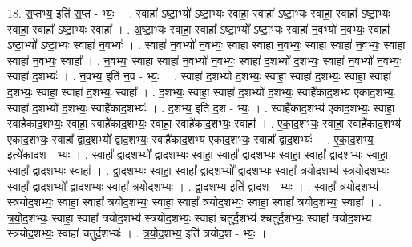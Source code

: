 \documentclass[17pt]{extarticle}
\begin{document}
18. स॒प्तभ्य॒ इति॑ स॒प्त - भ्यः॒ । . स्वाहा᳚ ऽष्टा॒भ्यो᳚ ऽष्टा॒भ्यः स्वाहा॒ स्वाहा᳚ ऽष्टा॒भ्यः स्वाहा॒ स्वाहा᳚ ऽष्टा॒भ्यः स्वाहा॒ स्वाहा᳚ ऽष्टा॒भ्यः स्वाहा᳚ । . अ॒ष्टा॒भ्यः स्वाहा॒ स्वाहा᳚ ऽष्टा॒भ्यो᳚ ऽष्टा॒भ्यः स्वाहा॑ न॒वभ्यो॑ न॒वभ्यः॒ स्वाहा᳚ ऽष्टा॒भ्यो᳚ ऽष्टा॒भ्यः स्वाहा॑ न॒वभ्यः॑ । . स्वाहा॑ न॒वभ्यो॑ न॒वभ्यः॒ स्वाहा॒ स्वाहा॑ न॒वभ्यः॒ स्वाहा॒ स्वाहा॑ न॒वभ्यः॒ स्वाहा॒ स्वाहा॑ न॒वभ्यः॒ स्वाहा᳚ । . न॒वभ्यः॒ स्वाहा॒ स्वाहा॑ न॒वभ्यो॑ न॒वभ्यः॒ स्वाहा॑ द॒शभ्यो॑ द॒शभ्यः॒ स्वाहा॑ न॒वभ्यो॑ न॒वभ्यः॒ स्वाहा॑ द॒शभ्यः॑ । . न॒वभ्य॒ इति॑ न॒व - भ्यः॒ । . स्वाहा॑ द॒शभ्यो॑ द॒शभ्यः॒ स्वाहा॒ स्वाहा॑ द॒शभ्यः॒ स्वाहा॒ स्वाहा॑ द॒शभ्यः॒ स्वाहा॒ स्वाहा॑ द॒शभ्यः॒ स्वाहा᳚ । . द॒शभ्यः॒ स्वाहा॒ स्वाहा॑ द॒शभ्यो॑ द॒शभ्यः॒ स्वाहै॑काद॒शभ्य॑ एकाद॒शभ्यः॒ स्वाहा॑ द॒शभ्यो॑ द॒शभ्यः॒ स्वाहै॑काद॒शभ्यः॑ । . द॒शभ्य॒ इति॑ द॒श - भ्यः॒ । . स्वाहै॑काद॒शभ्य॑ एकाद॒शभ्यः॒ स्वाहा॒ स्वाहै॑काद॒शभ्यः॒ स्वाहा॒ स्वाहै॑काद॒शभ्यः॒ स्वाहा॒ 
स्वाहै॑काद॒शभ्यः॒ स्वाहा᳚ । . ए॒का॒द॒शभ्यः॒ स्वाहा॒ स्वाहै॑काद॒शभ्य॑ एकाद॒शभ्यः॒ स्वाहा᳚ द्वाद॒शभ्यो᳚ द्वाद॒शभ्यः॒ 
स्वाहै॑काद॒शभ्य॑ एकाद॒शभ्यः॒ स्वाहा᳚ द्वाद॒शभ्यः॑ । . ए॒का॒द॒शभ्य॒ इत्ये॑काद॒श - भ्यः॒ । . स्वाहा᳚ द्वाद॒शभ्यो᳚ द्वाद॒शभ्यः॒ स्वाहा॒ स्वाहा᳚ द्वाद॒शभ्यः॒ स्वाहा॒ स्वाहा᳚ द्वाद॒शभ्यः॒ स्वाहा॒ स्वाहा᳚ द्वाद॒शभ्यः॒ स्वाहा᳚ । . द्वा॒द॒शभ्यः॒ स्वाहा॒ स्वाहा᳚ द्वाद॒शभ्यो᳚ द्वाद॒शभ्यः॒ स्वाहा᳚ त्रयोद॒शभ्य॑ स्त्रयोद॒शभ्यः॒ स्वाहा᳚ द्वाद॒शभ्यो᳚ द्वाद॒शभ्यः॒ स्वाहा᳚ त्रयोद॒शभ्यः॑ । . द्वा॒द॒शभ्य॒ इति॑ द्वाद॒श - भ्यः॒ । . स्वाहा᳚ त्रयोद॒शभ्य॑ स्त्रयोद॒शभ्यः॒ स्वाहा॒ स्वाहा᳚ त्रयोद॒शभ्यः॒ स्वाहा॒ स्वाहा᳚ त्रयोद॒शभ्यः॒ स्वाहा॒ स्वाहा᳚ त्रयोद॒शभ्यः॒ स्वाहा᳚ । . त्र॒यो॒द॒शभ्यः॒ स्वाहा॒ स्वाहा᳚ त्रयोद॒शभ्य॑ स्त्रयोद॒शभ्यः॒ स्वाहा॑ चतुर्द॒शभ्य॑ श्चतुर्द॒शभ्यः॒ स्वाहा᳚ त्रयोद॒शभ्य॑ स्त्रयोद॒शभ्यः॒ स्वाहा॑ चतुर्द॒शभ्यः॑ । . त्र॒यो॒द॒शभ्य॒ इति॑ त्रयोद॒श - भ्यः॒ । \newline
\end{document}
